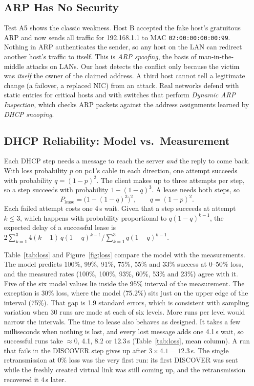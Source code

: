\documentclass[11pt]{article}
\begin{document}
\subsection{ARP Has No Security}
Test A5 shows the classic weakness. Host B accepted the fake host's gratuitous ARP and
now sends all traffic for 192.168.1.1 to MAC \texttt{02:00:00:00:00:99}. Nothing in ARP
authenticates the sender, so any host on the LAN can redirect another host's traffic to
itself. This is \emph{ARP spoofing}, the basis of man-in-the-middle attacks on LANs. Our
host detects the conflict only because the victim was \emph{itself} the owner of the
claimed address. A third host cannot tell a legitimate change (a failover, a replaced
NIC) from an attack. Real networks defend with static entries for critical hosts and
with switches that perform \emph{Dynamic ARP Inspection}, which checks ARP packets
against the address assignments learned by \emph{DHCP snooping}.

\subsection{DHCP Reliability: Model vs.\ Measurement}
\label{sec:lossanalysis}
Each DHCP step needs a message to reach the server \emph{and} the reply to come back.
With loss probability $p$ on pc1's cable in each direction, one attempt succeeds with
probability $q=(1-p)^2$. The client makes up to three attempts per step, so a step
succeeds with probability $1-(1-q)^3$. A lease needs both steps, so
\[
P_{\text{lease}} = \bigl(1-(1-q)^3\bigr)^2, \qquad q=(1-p)^2 .
\]
Each failed attempt costs one 4\,s wait. Given that a step succeeds at attempt $k\le3$,
which happens with probability proportional to $q(1-q)^{k-1}$, the expected delay of a
successful lease is
$2\sum_{k=1}^{3}4(k-1)\,q(1-q)^{k-1}\big/\sum_{k=1}^{3}q(1-q)^{k-1}$.

Table~\ref{tab:loss} and Figure~\ref{fig:loss} compare the model with the measurements.
The model predicts 100\%, 99\%, 91\%, 75\%, 55\% and 33\% success at 0--50\% loss, and
the measured rates (100\%, 100\%, 93\%, 60\%, 53\% and 23\%) agree with it. Five of the six model values lie inside the 95\% interval of the
measurement. The exception is 30\% loss, where the model (75.2\%) sits just on the upper
edge of the interval (75\%). That gap is 1.9 standard errors, which is consistent with
sampling variation when 30 runs are made at each of six levels. More runs per level would
narrow the intervals. The time to lease also behaves as designed.
It takes a few milliseconds when nothing is lost, and every lost message adds one 4.1\,s
wait, so successful runs take $\approx0$, 4.1, 8.2 or 12.3\,s (Table~\ref{tab:loss},
mean column). A run that fails in the DISCOVER step gives up after
$3\times4.1=12.3$\,s. The single retransmission at 0\% loss was the very first run: its
first DISCOVER was sent while the freshly created virtual link was still coming up, and
the retransmission recovered it 4\,s later.
\end{document}
